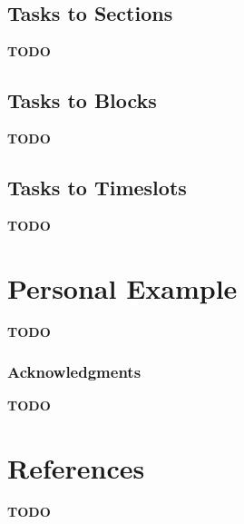 \documentclass{article}
\newcommand{\todo}[1]{{\bf TODO #1}\\}
\begin{document}
\newpage
\subsection{Tasks to Sections}
\todo{}
\vspace{2.5in}

\subsection{Tasks to Blocks}
\todo{}
\vspace{2.5in}
\subsection{Tasks to Timeslots}
\todo{}

\newpage
\section{Personal Example}
\todo{}
\vspace{5in}



\subsubsection*{Acknowledgments}
\todo{}
\section*{References}
\todo{}

%
\end{document}
